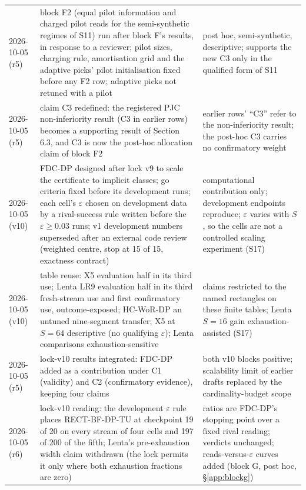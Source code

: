 \documentclass[sigconf,anonymous,review]{acmart}
\newcommand{\eps}{\varepsilon}
\begin{document}
\begin{table}[t]
\begin{tabular}{@{}l>{\raggedright\arraybackslash}p{6.6cm}>{\raggedright\arraybackslash}p{7.6cm}@{}}
2026-10-05 (r5) & block F2 (equal pilot information and charged pilot reads for the semi-synthetic regimes of S11) run after block F's results, in response to a reviewer; pilot sizes, charging rule, amortisation grid and the adaptive picks' pilot initialisation fixed before any F2 row; adaptive picks not retuned with a pilot & post hoc, semi-synthetic, descriptive; supports the new C3 only in the qualified form of S11 \\
2026-10-05 (r5) & claim C3 redefined: the registered PJC non-inferiority result (C3 in earlier rows) becomes a supporting result of Section 6.3, and C3 is now the post-hoc allocation claim of block F2 & earlier rows' ``C3'' refer to the non-inferiority result; the post-hoc C3 carries no confirmatory weight \\
2026-10-05 (v10) & FDC-DP designed after lock v9 to scale the certificate to implicit classes; go criteria fixed before its development runs; each cell's $\eps$ chosen on development data by a rival-success rule written before the $\eps \ge 0.03$ runs; v1 development numbers superseded after an external code review (weighted centre, stop at 15 of 15, exactness contract) & computational contribution only; development endpoints reproduce; $\eps$ varies with $S$, so the cells are not a controlled scaling experiment (S17) \\
2026-10-05 (v10) & table reuse: X5 evaluation half in its third use; Lenta LR9 evaluation half in its third fresh-stream use and first confirmatory use, outcome-exposed; HC-WoR-DP an untuned nine-segment transfer; X5 at $S = 64$ descriptive (no qualifying $\eps$); Lenta comparisons exhaustion-sensitive & claims restricted to the named rectangles on these finite tables; Lenta $S = 16$ gain exhaustion-assisted (S17) \\
2026-10-05 (r5) & lock-v10 results integrated: FDC-DP added as a contribution under C1 (validity) and C2 (confirmatory evidence), keeping four claims & both v10 blocks positive; scalability limit of earlier drafts replaced by the cardinality-budget scope \\
2026-10-05 (r6) & lock-v10 reading: the development $\eps$ rule places RECT-BF-DP-TU at checkpoint 19 of 20 on every stream of four cells and 197 of 200 of the fifth; Lenta's pre-exhaustion width claim withdrawn (the lock permits it only where both exhaustion fractions are zero) & ratios are FDC-DP's stopping point over a fixed rival reading; verdicts unchanged; reads-versus-$\eps$ curves added (block G, post hoc, \S\ref{app:blockg}) \\

\end{tabular}
\end{table}
\end{document}
